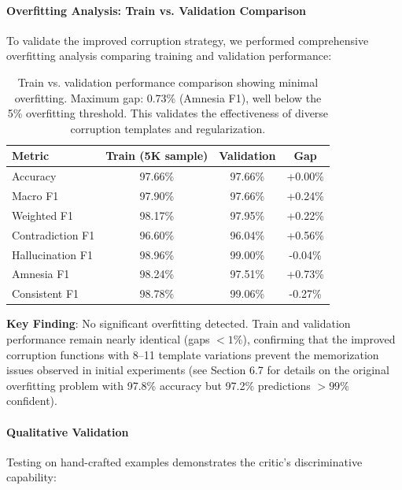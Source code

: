 \documentclass[11pt]{article}
\begin{document}
\paragraph{Overfitting Analysis: Train vs. Validation Comparison}
To validate the improved corruption strategy, we performed comprehensive overfitting analysis comparing training and validation performance:

\begin{table}[h]
\centering
\begin{tabular}{lccc}
\toprule
\textbf{Metric} & \textbf{Train (5K sample)} & \textbf{Validation} & \textbf{Gap} \\
\midrule
Accuracy & 97.66\% & 97.66\% & +0.00\% \\
Macro F1 & 97.90\% & 97.66\% & +0.24\% \\
Weighted F1 & 98.17\% & 97.95\% & +0.22\% \\
\midrule
Contradiction F1 & 96.60\% & 96.04\% & +0.56\% \\
Hallucination F1 & 98.96\% & 99.00\% & -0.04\% \\
Amnesia F1 & 98.24\% & 97.51\% & +0.73\% \\
Consistent F1 & 98.78\% & 99.06\% & -0.27\% \\
\bottomrule
\end{tabular}
\caption{Train vs. validation performance comparison showing minimal overfitting. Maximum gap: 0.73\% (Amnesia F1), well below the 5\% overfitting threshold. This validates the effectiveness of diverse corruption templates and regularization.}
\end{table}

\textbf{Key Finding}: No significant overfitting detected. Train and validation performance remain nearly identical (gaps $<1\%$), confirming that the improved corruption functions with 8--11 template variations prevent the memorization issues observed in initial experiments (see Section 6.7 for details on the original overfitting problem with 97.8\% accuracy but 97.2\% predictions $>99\%$ confident).

\paragraph{Qualitative Validation}
Testing on hand-crafted examples demonstrates the critic's discriminative capability:
\end{document}
